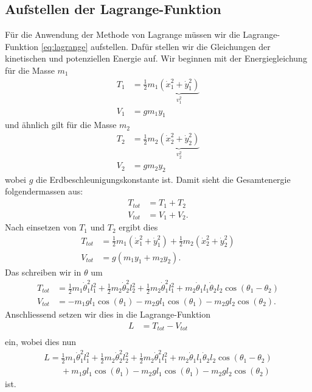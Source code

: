 \subsection{Aufstellen der Lagrange-Funktion}
Für die Anwendung der Methode von Lagrange müssen wir die Lagrange-Funktion 
\eqref{eq:lagrange} aufstellen.
Dafür stellen wir die Gleichungen der kinetischen und potenziellen Energie auf.
Wir beginnen mit der Energiegleichung für die Masse \(m_1\)
\begin{align}
    T_1 &= \frac{1}{2} m_1 
    \underbrace{( \dot{x}_1^2 + \dot{y}_1^2 )}_{\displaystyle v_1^2}\\
    V_1 &= g m_1 y_1
\end{align}
und ähnlich gilt für die Masse \(m_2\)
\begin{align}
    T_2 &= \frac{1}{2} m_2 
    \underbrace{( \dot{x}_2^2 + \dot{y}_2^2 )}_{\displaystyle v_2^2}\\
    V_2 &= g m_2 y_2
\end{align}
wobei \(g\) die Erdbeschleunigungskonstante ist.
Damit sieht die Gesamtenergie folgendermassen aus:
\begin{align}
    T_{tot} &= T_1 + T_2\\
    V_{tot} &= V_1 + V_2.
\end{align}
Nach einsetzen von \(T_1\) und \(T_2\) ergibt dies
\begin{align}
    T_{tot} &= \frac{1}{2} m_1 ( \dot{x}_1^2 + \dot{y}_1^2 ) +
    \frac{1}{2} m_2 ( \dot{x}_2^2 + \dot{y}_2^2 )\\
    V_{tot} &= g ( m_1 y_1 + m_2 y_2 ).
\end{align}
Das schreiben wir in \(\theta\) um
\begin{align}
    T_{tot} &= \frac{1}{2} m_1 \dot{\theta}^2_1 l_1^2 + 
    \frac{1}{2} m_2 \dot{\theta}^2_2 l_2^2 + \frac{1}{2}
    m_2 \dot{\theta}^2_1 l_1^2 + 
    m_2 \dot{\theta}_1 l_1 \dot{\theta}_2 l_2 
    \cos(\theta_1 - \theta_2)\\
    V_{tot} &= -m_1 g l_1 \cos(\theta_1) -
    m_2 g l_1 \cos(\theta_1) -
    m_2 g l_2 \cos(\theta_2).
\end{align}
Anschliessend setzen wir dies in die Lagrange-Funktion
\begin{align}
    L &= T_{tot} - V_{tot}\\
\end{align}
ein, wobei dies nun
\begin{align}
    L = \frac{1}{2} m_1 \dot{\theta}^2_1 l_1^2 + 
    \frac{1}{2} m_2 \dot{\theta}^2_2 l_2^2 + \frac{1}{2}
    m_2 \dot{\theta}^2_1 l_1^2 + 
    m_2 \dot{\theta}_1 l_1 \dot{\theta}_2 l_2 
    \cos(\theta_1 - \theta_2)\\ \nonumber
    \qquad + m_1 g l_1 \cos(\theta_1) -
    m_2 g l_1 \cos(\theta_1) -
    m_2 g l_2 \cos(\theta_2)
\end{align}
ist.

